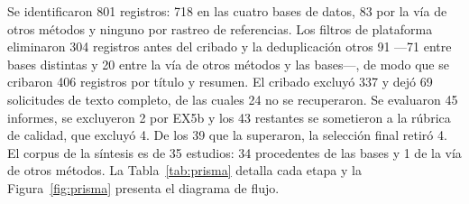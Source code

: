 \documentclass[pdflatex,sn-mathphys-num]{sn-jnl}
\theoremstyle{thmstyleone}
\theoremstyle{thmstyletwo}
\theoremstyle{thmstylethree}
\begin{document}
Se identificaron 801 registros: 718 en las cuatro bases de datos, 83 por la vía de otros métodos y ninguno por rastreo de referencias. Los filtros de plataforma eliminaron 304 registros antes del cribado y la deduplicación otros 91 ---71 entre bases distintas y 20 entre la vía de otros métodos y las bases---, de modo que se cribaron 406 registros por título y resumen. El cribado excluyó 337 y dejó 69 solicitudes de texto completo, de las cuales 24 no se recuperaron. Se evaluaron 45 informes, se excluyeron 2 por EX5b y los 43 restantes se sometieron a la rúbrica de calidad, que excluyó 4. De los 39 que la superaron, la selección final retiró 4. El corpus de la síntesis es de 35 estudios: 34 procedentes de las bases y 1 de la vía de otros métodos. La Tabla~\ref{tab:prisma} detalla cada etapa y la Figura~\ref{fig:prisma} presenta el diagrama de flujo.
\end{document}
